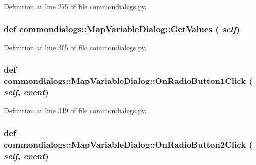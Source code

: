 Definition at line 275 of file commondialogs.py.\hypertarget{classcommondialogs_1_1MapVariableDialog_c447e821ce5690bdcd4f55d3b6e82cc0}{
\subsubsection[GetValues]{\setlength{\rightskip}{0pt plus 5cm}def commondialogs::Map\-Variable\-Dialog::Get\-Values ( {\em self})}}
\label{classcommondialogs_1_1MapVariableDialog_c447e821ce5690bdcd4f55d3b6e82cc0}




Definition at line 305 of file commondialogs.py.\hypertarget{classcommondialogs_1_1MapVariableDialog_63c2f5b4975384238c3b2aeabaeb6a11}{
\subsubsection[OnRadioButton1Click]{\setlength{\rightskip}{0pt plus 5cm}def commondialogs::Map\-Variable\-Dialog::On\-Radio\-Button1Click ( {\em self},  {\em event})}}
\label{classcommondialogs_1_1MapVariableDialog_63c2f5b4975384238c3b2aeabaeb6a11}




Definition at line 319 of file commondialogs.py.\hypertarget{classcommondialogs_1_1MapVariableDialog_6d8ff9549883ff0b0313891884e1183a}{
\subsubsection[OnRadioButton2Click]{\setlength{\rightskip}{0pt plus 5cm}def commondialogs::Map\-Variable\-Dialog::On\-Radio\-Button2Click ( {\em self},  {\em event})}}
\label{classcommondialogs_1_1MapVariableDialog_6d8ff9549883ff0b0313891884e1183a}




